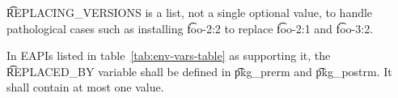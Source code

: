\t{REPLACING\_VERSIONS} is a list, not a single optional value, to handle pathological cases such as
installing \t{foo-2:2} to replace \t{foo-2:1} and \t{foo-3:2}.

In EAPIs listed in table~\ref{tab:env-vars-table} as supporting it, the \t{REPLACED\_BY} variable
shall be defined in \t{pkg\_prerm} and \t{pkg\_postrm}. It shall contain at most one value.



